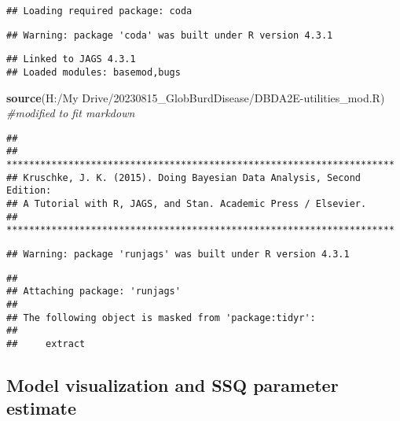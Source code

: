 \documentclass[
]{article}
\newenvironment{Shaded}{\begin{snugshade}}{\end{snugshade}}
\newcommand{\CommentTok}[1]{\textcolor[rgb]{0.56,0.35,0.01}{\textit{#1}}}
\newcommand{\FunctionTok}[1]{\textcolor[rgb]{0.13,0.29,0.53}{\textbf{#1}}}
\newcommand{\NormalTok}[1]{#1}
\newcommand{\StringTok}[1]{\textcolor[rgb]{0.31,0.60,0.02}{#1}}
\begin{document}
\begin{verbatim}
## Loading required package: coda
\end{verbatim}

\begin{verbatim}
## Warning: package 'coda' was built under R version 4.3.1
\end{verbatim}

\begin{verbatim}
## Linked to JAGS 4.3.1
## Loaded modules: basemod,bugs
\end{verbatim}

\begin{Shaded}
\begin{Highlighting}[]
\FunctionTok{source}\NormalTok{(}\StringTok{\textquotesingle{}H:/My Drive/20230815\_GlobBurdDisease/DBDA2E{-}utilities\_mod.R\textquotesingle{}}\NormalTok{)  }\CommentTok{\#modified to fit markdown}
\end{Highlighting}
\end{Shaded}

\begin{verbatim}
## 
## *********************************************************************
## Kruschke, J. K. (2015). Doing Bayesian Data Analysis, Second Edition:
## A Tutorial with R, JAGS, and Stan. Academic Press / Elsevier.
## *********************************************************************
\end{verbatim}

\begin{verbatim}
## Warning: package 'runjags' was built under R version 4.3.1
\end{verbatim}

\begin{verbatim}
## 
## Attaching package: 'runjags'
## 
## The following object is masked from 'package:tidyr':
## 
##     extract
\end{verbatim}

\hypertarget{model-visualization-and-ssq-parameter-estimate}{%
\subsection{Model visualization and SSQ parameter
estimate}\label{model-visualization-and-ssq-parameter-estimate}}
\end{document}

